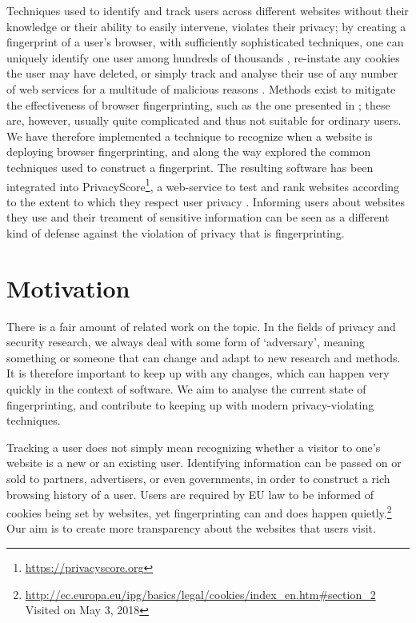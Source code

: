 \documentclass[
    fontsize=12pt,
    headings=small,
    parskip=half,
    bibliography=totoc,
    numbers=noenddot,
    open=any
    ]{scrreprt}
\begin{document}
Techniques used to identify and track users across different websites without
their knowledge or their ability to easily intervene, violates their privacy; by creating a fingerprint
of a user's browser, with sufficiently sophisticated techniques, one can uniquely identify one user
among hundreds of thousands \cite{am_i_unique}, re-instate any cookies the user may have deleted,
or simply track and analyse their use of any number of web services for a multitude of malicious reasons \cite{eckersley2010unique}.
Methods exist to mitigate the effectiveness of browser fingerprinting, such as the one presented
in \cite{laperdrix2015mitigating};
these are, however, usually quite complicated and thus not suitable for ordinary users.
We have therefore implemented a technique to recognize when a website is deploying browser fingerprinting,
and along the way explored the common techniques used to construct a fingerprint. The resulting software has been integrated into
PrivacyScore\footnote{\url{https://privacyscore.org}}, a web-service to test and rank websites according to the extent to which they
respect user privacy \cite{privacyscore}.
Informing users about websites they use and their treament of sensitive information
can be seen as a different kind of defense against the violation of privacy that is fingerprinting.

\section{Motivation}
There is a fair amount of related work on the topic. In the fields of privacy and security research,
we always deal with some form of `adversary', meaning something or someone that can change and adapt to new
research and methods. It is therefore important to keep up with any changes, which can happen very quickly
in the context of software.
We aim to analyse the current state of fingerprinting, and contribute to keeping up with modern privacy-violating
techniques.

Tracking a user does not simply mean recognizing whether a visitor to one's website is a new or an existing user.
Identifying information can be passed on or sold to partners, advertisers, or even governments, in order to
construct a rich browsing history of a user. Users are required by EU law to be informed of cookies being set
by websites, yet fingerprinting can and does happen quietly.\footnote{\url{http://ec.europa.eu/ipg/basics/legal/cookies/index\_en.htm\#section\_2} Visited on May 3, 2018}
Our aim is to create more transparency about the websites that users visit.
\end{document}
